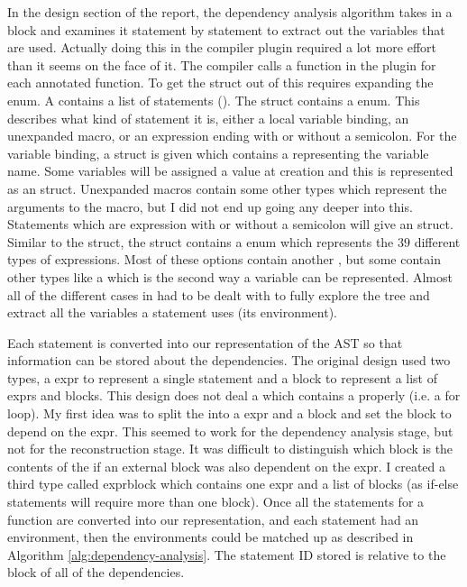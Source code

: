 In the design section of the report, the dependency analysis algorithm takes in a block and examines it statement by statement to extract out the variables that are used. Actually doing this in the compiler plugin required a lot more effort than it seems on the face of it. The compiler calls a function in the plugin for each annotated function. To get the  struct out of this requires expanding the  enum. A  contains a list of statements (). The  struct contains a  enum. This describes what kind of statement it is, either a local variable binding, an unexpanded macro, or an expression ending with or without a semicolon. For the variable binding, a  struct is given which contains a  representing the variable name. Some variables will be assigned a value at creation and this is represented as an  struct. Unexpanded macros contain some other types which represent the arguments to the macro, but I did not end up going any deeper into this. Statements which are expression with or without a semicolon will give an  struct. Similar to the  struct, the  struct contains a  enum which represents the $39$ different types of expressions. Most of these options contain another , but some contain other types like a  which is the second way a variable can be represented. Almost all of the different cases in  had to be dealt with to fully explore the tree and extract all the variables a statement uses (its environment).

Each statement is converted into our representation of the AST so that information can be stored about the dependencies. The original design used two types, a expr to represent a single statement and a block to represent a list of exprs and blocks. This design does not deal a  which contains a  properly (i.e. a for loop). My first idea was to split the  into a expr and a block and set the block to depend on the expr. This seemed to work for the dependency analysis stage, but not for the reconstruction stage. It was difficult to distinguish which block is the contents of the  if an external block was also dependent on the expr. I created a third type called exprblock which contains one expr and a list of blocks (as if-else statements will require more than one block). Once all the statements for a function are converted into our representation, and each statement had an environment, then the environments could be matched up as described in Algorithm \ref{alg:dependency-analysis}. The statement ID stored is relative to the block of all of the dependencies.

